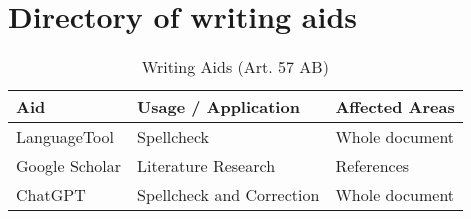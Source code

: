 %
\newpage
\pagestyle{empty}
\onecolumn

\section*{Directory of writing aids}

\begin{table}[h!]
	\centering
	\begin{tabularx}{\textwidth}{|X|X|X|}
		\hline
		\textbf{Aid}   & \textbf{Usage / Application} & \textbf{Affected Areas} \\
		\hline
		LanguageTool   & Spellcheck                   & Whole document          \\
		\hline
		Google Scholar & Literature Research          & References              \\
		ChatGPT        & Spellcheck and Correction    & Whole document          \\
		\hline
	\end{tabularx}
	\caption{Writing Aids (Art. 57 AB)}
\end{table}
